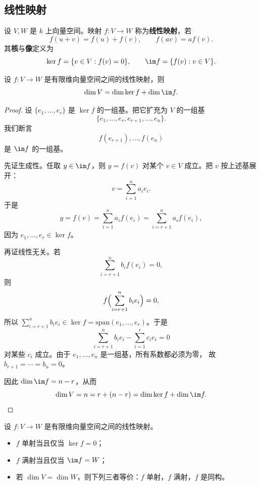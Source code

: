 \subsection{线性映射}

\begin{definition}
设 $V,W$ 是 $k$ 上向量空间。映射 $f\colon V\to W$ 称为\textbf{线性映射}，若
\[
  f(u+v)=f(u)+f(v),
  \qquad
  f(av)=af(v).
\]
其\textbf{核}与\textbf{像}定义为
\begin{equation}
  \ker f = \{v\in V : f(v)=0\},
  \qquad
  \im f = \{f(v):v\in V\}.
\end{equation}
\end{definition}

\begin{theorem}[秩--零化度定理]
设 $f\colon V\to W$ 是有限维向量空间之间的线性映射，则
\begin{equation}
  \dim V = \dim \ker f + \dim \im f.
\end{equation}
\end{theorem}

\begin{proof}
设 $\{e_1,\dots,e_r\}$ 是 $\ker f$ 的一组基。把它扩充为 $V$ 的一组基
\[
  \{e_1,\dots,e_r,e_{r+1},\dots,e_n\}.
\]
我们断言
\[
  f(e_{r+1}),\dots,f(e_n)
\]
是 $\im f$ 的一组基。

先证生成性。任取 $y\in \im f$，则 $y=f(v)$ 对某个 $v\in V$ 成立。把 $v$ 按上述基展开：
\[
  v=\sum_{i=1}^n a_i e_i.
\]
于是
\[
  y=f(v)=\sum_{i=1}^n a_i f(e_i)=\sum_{i=r+1}^n a_i f(e_i),
\]
因为 $e_1,\dots,e_r\in\ker f$。

再证线性无关。若
\[
  \sum_{i=r+1}^n b_i f(e_i)=0,
\]
则
\[
  f\Bigl(\sum_{i=r+1}^n b_i e_i\Bigr)=0,
\]
所以 $\sum_{i=r+1}^n b_i e_i\in \ker f=\mathrm{span}(e_1,\dots,e_r)$。于是
\[
  \sum_{i=r+1}^n b_i e_i - \sum_{i=1}^r c_i e_i = 0
\]
对某些 $c_i$ 成立。由于 $e_1,\dots,e_n$ 是一组基，所有系数都必须为零，
故 $b_{r+1}=\cdots=b_n=0$。

因此 $\dim\im f = n-r$，从而
\[
  \dim V = n = r+(n-r)=\dim\ker f + \dim\im f.
\]
\end{proof}

\begin{corollary}
设 $f\colon V\to W$ 是有限维向量空间之间的线性映射。
\begin{itemize}
  \item $f$ 单射当且仅当 $\ker f=0$；
  \item $f$ 满射当且仅当 $\im f=W$；
  \item 若 $\dim V=\dim W$，则下列三者等价：$f$ 单射，$f$ 满射，$f$ 是同构。
\end{itemize}
\end{corollary}

